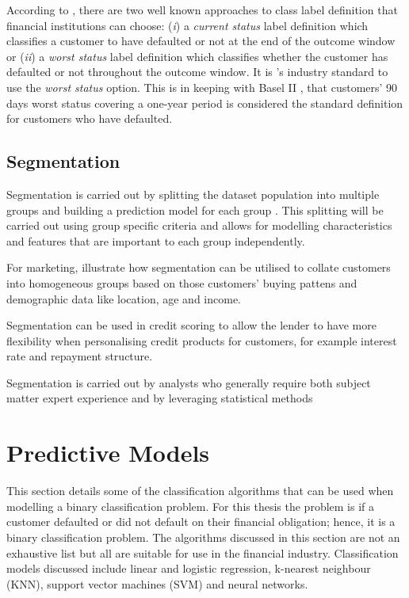 According to \cite{anderson_credit_2007}, there are two well known approaches to class label definition that financial institutions can choose: (\textit{i}) a \textit{current status} label definition which classifies a customer to have defaulted or not at the end of the outcome window or (\textit{ii}) a \textit{worst status} label definition which classifies whether the customer has defaulted or not throughout the outcome window. It is \subjectname's industry standard to use the \textit{worst status} option. This is in keeping with Basel II \citep{basel_international_2006}, that customers' 90 days worst status covering a one-year period is considered the standard definition for customers who have defaulted. 


\subsection{Segmentation}\label{sec:segment}
Segmentation is carried out by splitting the dataset population into multiple groups and building a prediction model for each group \citep{myatt_making_2007}. This splitting will be carried out using group specific criteria and allows for modelling characteristics and features that are important to each group independently.

For marketing, \cite{wedel_market_2012} illustrate how segmentation can be utilised to collate customers into homogeneous groups based on those customers' buying pattens and demographic data like location, age and income.

Segmentation can be used in credit scoring to allow the lender to have more flexibility when personalising credit products for customers, for example interest rate and repayment structure\citep{kennedy_credit_2013}.

Segmentation is carried out by analysts who generally require both subject matter expert experience and by leveraging statistical methods \citep{siddiqi_credit_2012}


\section{Predictive Models}\label{sec:predictModels}
This section details some of the classification algorithms that can be used when modelling a binary classification problem. For this thesis the problem is if a customer defaulted or did not default on their financial obligation; hence, it is a binary classification problem. The algorithms discussed in this section are not an exhaustive list but all are suitable for use in the financial industry. Classification models discussed include linear and logistic regression, k-nearest neighbour (KNN), support vector machines (SVM) and neural networks. 

